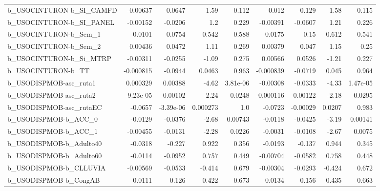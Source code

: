 \begin{tabular}{lrrrrrrrr}
b\_USOCINTURON-b\_SI\_CAMFD   &    -0.00637 &      -0.0647 &      1.59 &    0.112 &     -0.012 &      -0.129 &         1.58 &         0.115 \\
b\_USOCINTURON-b\_SI\_PANEL   &    -0.00152 &      -0.0206 &       1.2 &    0.229 &   -0.00391 &     -0.0607 &         1.21 &         0.226 \\
b\_USOCINTURON-b\_Sem\_1      &      0.0101 &       0.0754 &     0.542 &    0.588 &     0.0175 &        0.15 &        0.612 &         0.541 \\
b\_USOCINTURON-b\_Sem\_2      &     0.00436 &       0.0472 &      1.11 &    0.269 &    0.00379 &       0.047 &         1.15 &          0.25 \\
b\_USOCINTURON-b\_Si\_MTRP    &    -0.00311 &      -0.0255 &     -1.09 &    0.275 &    0.00566 &      0.0526 &        -1.21 &         0.227 \\
b\_USOCINTURON-b\_TT         &   -0.000815 &      -0.0944 &    0.0463 &    0.963 &  -0.000839 &     -0.0719 &        0.045 &         0.964 \\
b\_USODISPMOB-asc\_ruta1     &    0.000329 &      0.00388 &     -4.62 & 3.81e-06 &   -0.00308 &     -0.0333 &        -4.33 &      1.47e-05 \\
b\_USODISPMOB-asc\_ruta2     &   -9.23e-05 &     -0.00102 &     -2.24 &   0.0248 &  -0.000116 &    -0.00122 &        -2.18 &        0.0295 \\
b\_USODISPMOB-asc\_rutaEC    &     -0.0657 &    -3.39e-06 &  0.000273 &      1.0 &    -0.0723 &    -0.00029 &       0.0207 &         0.983 \\
b\_USODISPMOB-b\_ACC\_0       &     -0.0129 &      -0.0376 &     -2.68 &  0.00743 &    -0.0118 &     -0.0425 &        -3.19 &       0.00141 \\
b\_USODISPMOB-b\_ACC\_1       &    -0.00455 &      -0.0131 &     -2.28 &   0.0226 &    -0.0031 &     -0.0108 &        -2.67 &        0.0075 \\
b\_USODISPMOB-b\_Adulto40    &     -0.0318 &       -0.227 &     0.922 &    0.356 &    -0.0193 &      -0.137 &        0.944 &         0.345 \\
b\_USODISPMOB-b\_Adulto60    &     -0.0114 &      -0.0952 &     0.757 &    0.449 &   -0.00704 &     -0.0582 &        0.758 &         0.448 \\
b\_USODISPMOB-b\_CLLUVIA     &    -0.00569 &      -0.0533 &    -0.414 &    0.679 &   -0.00304 &     -0.0293 &       -0.424 &         0.672 \\
b\_USODISPMOB-b\_CongAB      &      0.0111 &        0.126 &    -0.422 &    0.673 &     0.0134 &       0.156 &       -0.435 &         0.663 \\

\end{tabular}
